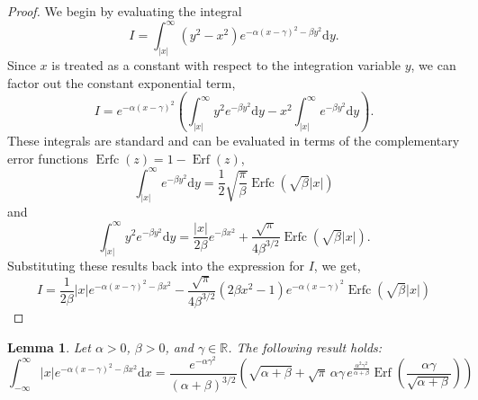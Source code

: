 \documentclass[journal]{IEEEtran}
\theoremstyle{plain}
\newtheorem{lemma}[theorem]{Lemma}
\theoremstyle{definition}
\theoremstyle{remark}
\newcommand{\R}{\mathbb{R}}
\newcommand{\Erf}{\operatorname{Erf}}
\newcommand{\Erfc}{\operatorname{Erfc}}
\newcommand{\dd}{\mathrm{d}}
\begin{document}
\begin{proof}
We begin by evaluating the integral
\begin{equation}
I = \int_{|x|}^{\infty} \left( y^{2} - x^{2} \right) e^{ -\alpha (x - \gamma)^{2} - \beta y^{2} } \dd y.
\end{equation}
Since \(x\) is treated as a constant with respect to the integration variable \(y\), we can factor out the constant exponential term,
\begin{equation}
I = e^{ -\alpha (x - \gamma)^{2} } \left( \int_{|x|}^{\infty} y^{2} e^{ -\beta y^{2} } \dd y - x^{2} \int_{|x|}^{\infty} e^{ -\beta y^{2} } \dd y \right).
\end{equation}
These integrals are standard and can be evaluated in terms of the complementary error functions $\Erfc(z) = 1 - \Erf(z)$,
\begin{equation}
\int_{|x|}^{\infty} e^{ -\beta y^{2} } \dd y = \frac{1}{2} \sqrt{\frac{\pi}{\beta}} \Erfc\left(\sqrt{\beta}|x|\right)
\end{equation}
and
\begin{equation}
\int_{|x|}^{\infty} y^{2} e^{ -\beta y^{2} } \dd y = \frac{|x|}{2 \beta} e^{-\beta x^{2}} + \frac{\sqrt{\pi}}{4 \beta^{3/2}} \Erfc\left(\sqrt{\beta}|x|\right).
\end{equation}
Substituting these results back into the expression for \(I\), we get,
\begin{equation}
I = \frac{1}{2 \beta}  |x|e^{ -\alpha (x - \gamma)^{2} -\beta x^{2}} - \frac{\sqrt{\pi}}{4 \beta^{3/2}} \left(2 \beta x^2 - 1\right) e^{ -\alpha (x - \gamma)^{2} } \Erfc\left(\sqrt{\beta}|x|\right)
\end{equation}
\end{proof}




\begin{lemma} \label{lemma:I1}
Let $\alpha > 0$, $\beta > 0$, and $\gamma \in \R$. The following result holds:
\begin{equation}
     \int_{-\infty}^\infty |x| e^{ -\alpha (x - \gamma)^{2} -\beta x^{2}} \dd x = \frac{e^{-\alpha  \gamma ^2}}{(\alpha +\beta )^{3/2}} \left(\sqrt{\alpha +\beta } + \sqrt{\pi } \, \alpha  \gamma \, e^{\frac{\alpha ^2 \gamma ^2}{\alpha +\beta }} \Erf \left(\frac{\alpha  \gamma }{\sqrt{\alpha +\beta }}\right)\right)
\end{equation}
\end{lemma}
\end{document}
